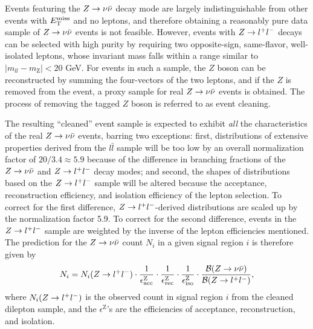 Events featuring the $Z\rightarrow \nu\bar{\nu}$ decay mode are largely indistinguishable from other events with $E_{\text{T}}^{\rm miss}$ and no leptons, and therefore obtaining a reasonably pure data sample of $Z\rightarrow \nu\bar{\nu}$ events is not feasible. However, events with $Z\rightarrow l^+l^-$ decays can be selected with high purity by requiring two opposite-sign, same-flavor, well-isolated leptons, whose invariant mass falls within a range similar to $|m_{ll}-m_\text{Z}|<20$ GeV. For events in such a sample, the $Z$ boson can be reconstructed by summing the four-vectors of the two leptons, and if the $Z$ is removed from the event, a proxy sample for real $Z\rightarrow \nu\bar{\nu}$ events is obtained. The process of removing the tagged $Z$ boson is referred to as event cleaning. 

The resulting ``cleaned'' event sample is expected to exhibit {\it all} the characteristics of the real $Z\rightarrow \nu\bar{\nu}$ events, barring two exceptions: first, distributions of extensive properties derived from the $l\bar{l}$ sample will be too low by an overall normalization factor of $20/3.4\approx5.9$ because of the difference in branching fractions of the $Z\rightarrow \nu\bar{\nu}$ and $Z\rightarrow l^+l^-$ decay modes; and second, the shapes of distributions based on the $Z\rightarrow l^+l^-$ sample will be altered because the acceptance, reconstruction efficiency, and isolation efficiency of the lepton selection. To correct for the first difference, $Z\rightarrow l^+l^-$-derived distributions are scaled up by the normalization factor 5.9. To correct for the second difference, events in the $Z\rightarrow l^+l^-$ sample are weighted by the inverse of the lepton efficiencies mentioned. The prediction for the $Z\rightarrow \nu\bar{\nu}$ count $N_i$ in a given signal region $i$ is therefore given by
\begin{equation}
N_i = N_i(Z\rightarrow l^+l^-)\cdot\frac{1}{\epsilon^{\text{Z}}_{\text{acc}}}\cdot\frac{1}{\epsilon^{\text{Z}}_{\text{rec}}}\cdot\frac{1}{\epsilon^{\text{Z}}_{\text{iso}}}\cdot\frac{\mathcal{B}(Z\rightarrow \nu\bar{\nu})}{\mathcal{B}(Z\rightarrow l^+l^-)},
\label{eq:zinv}
\end{equation}
where $N_i(Z\rightarrow l^+l^-)$ is the observed count in signal region $i$ from the cleaned dilepton sample, and the $\epsilon^{\text{Z}}$'s are the efficiencies of acceptance, reconstruction, and isolation.

